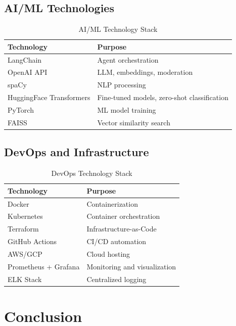 \documentclass[12pt,a4paper]{report}
\begin{document}
\section{AI/ML Technologies}

\begin{table}[H]
\centering
\small
\begin{tabular}{|l|l|}
\hline
\textbf{Technology} & \textbf{Purpose} \\
\hline
LangChain & Agent orchestration \\
OpenAI API & LLM, embeddings, moderation \\
spaCy & NLP processing \\
HuggingFace Transformers & Fine-tuned models, zero-shot classification \\
PyTorch & ML model training \\
FAISS & Vector similarity search \\
\hline
\end{tabular}
\caption{AI/ML Technology Stack}
\end{table}

\section{DevOps and Infrastructure}

\begin{table}[H]
\centering
\small
\begin{tabular}{|l|l|}
\hline
\textbf{Technology} & \textbf{Purpose} \\
\hline
Docker & Containerization \\
Kubernetes & Container orchestration \\
Terraform & Infrastructure-as-Code \\
GitHub Actions & CI/CD automation \\
AWS/GCP & Cloud hosting \\
Prometheus + Grafana & Monitoring and visualization \\
ELK Stack & Centralized logging \\
\hline
\end{tabular}
\caption{DevOps Technology Stack}
\end{table}

\newpage


\chapter*{Conclusion}
\end{document}
